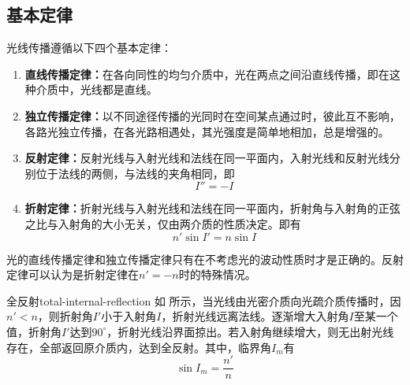 \subsection{基本定律}
\label{subsect:basic-law}
光线传播遵循以下四个基本定律：
\begin{enumerate}
	\item \textbf{直线传播定律：}在各向同性的均匀介质中，光在两点之间沿直线传播，即在这种介质中，光线都是直线。
	\item \textbf{独立传播定律：}以不同途径传播的光同时在空间某点通过时，彼此互不影响，各路光独立传播，在各光路相遇处，其光强度是简单地相加，总是增强的。
	\item \textbf{反射定律：}反射光线与入射光线和法线在同一平面内，入射光线和反射光线分别位于法线的两侧，与法线的夹角相同，即
	\begin{equation}
	I''=-I
	\end{equation}
	\item \textbf{折射定律：}折射光线与入射光线和法线在同一平面内，折射角与入射角的正弦之比与入射角的大小无关，仅由两介质的性质决定。即有
	\begin{equation}
	n'\sin I'=n\sin I
	\end{equation}
\end{enumerate}

\begin{note}
	光的直线传播定律和独立传播定律只有在不考虑光的波动性质时才是正确的。反射定律可以认为是折射定律在$n'=-n$时的特殊情况。
\end{note}

\begin{definition}{全反射}{total-internal-reflection}
	如 所示，当光线由光密介质向光疏介质传播时，因$n'<n$，则折射角$I'$小于入射角$I$，折射光线远离法线。逐渐增大入射角$I$至某一个值，折射角$I'$达到$90^{\circ}$，折射光线沿界面掠出。若入射角继续增大，则无出射光线存在，全部返回原介质内，达到全反射。其中，临界角$I_m$有
	\begin{equation}
	\sin I_m=\frac{n'}{n}
	\end{equation}
\end{definition}

